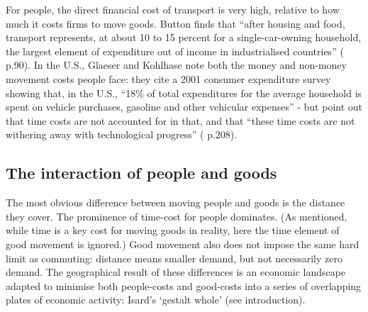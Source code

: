 {For people, the direct financial cost of transport is very high, relative to how much it costs firms to move goods. Button finds that ``after housing and food, transport represents, at about 10 to 15 percent for a single-car-owning household, the largest element of expenditure out of income in industrialised countries'' (\citealt{button_transport_2010} p.90). In the U.S., Glaeser and Kohlhase note both the money and non-money movement costs people face: they cite a 2001 consumer expenditure survey showing that, in the U.S., ``18\% of total expenditures for the average household is spent on vehicle purchases, gasoline and other vehicular expenses'' - but point out that time costs are not accounted for in that, and that ``these time costs are not withering away with technological progress'' (\citealt{glaeser_cities_2004} p.208). 

\subsection{The interaction of people and goods \label{sec:peopleInteraction}}

The most obvious difference between moving people and goods is the distance they cover. The prominence of time-cost for people dominates. (As mentioned, while time is a key cost for moving goods in reality, here the time element of good movement is ignored.) Good movement also does not impose the same hard limit as commuting: distance means smaller demand, but not necessarily zero demand. The geographical result of these differences is an economic landscape adapted to minimise both people-costs and good-costs into a series of overlapping plates of economic activity: Isard's `gestalt whole' (see introduction). 

}
